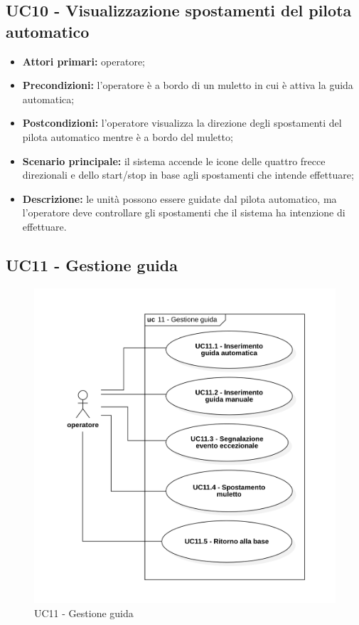 \subsection{UC10 - Visualizzazione spostamenti del pilota automatico}
\begin{itemize}
	\item 	\textbf{Attori primari:} operatore;
	\item 	\textbf{Precondizioni:} l'operatore è a bordo di un muletto in cui è attiva la guida automatica;
	\item 	\textbf{Postcondizioni:} l'operatore visualizza la direzione degli spostamenti del pilota automatico mentre è a bordo del muletto;
	\item 	\textbf{Scenario principale:} il sistema accende le icone delle quattro frecce direzionali e dello start/stop in base agli spostamenti che intende effettuare;
	\item 	\textbf{Descrizione:} le unità possono essere guidate dal pilota automatico, ma l'operatore deve controllare gli spostamenti che il sistema ha intenzione di effettuare.

\end{itemize}
 
\subsection{UC11 - Gestione guida}

\begin{figure}[H]
	\centering
	\includegraphics[scale=0.52]{res/images/uc11.png}
	\caption{ UC11 - Gestione guida}
\end{figure}

